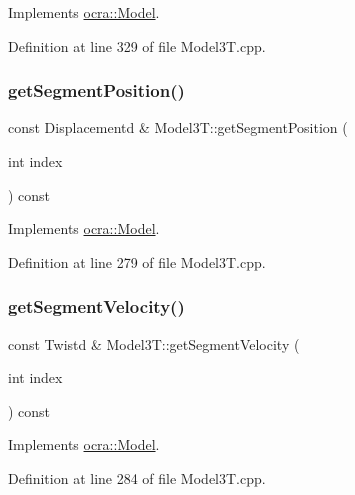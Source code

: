 Implements \hyperlink{classocra_1_1Model_ae296f35e785641df23e6cf4fdbb24f8a}{ocra\+::\+Model}.



Definition at line 329 of file Model3\+T.\+cpp.

\hypertarget{classModel3T_af2408d3a32ae4762ce3c5951360f5f67}{}\label{classModel3T_af2408d3a32ae4762ce3c5951360f5f67} 
\subsubsection{\texorpdfstring{get\+Segment\+Position()}{getSegmentPosition()}}
{\footnotesize\ttfamily const Displacementd \& Model3\+T\+::get\+Segment\+Position (\begin{DoxyParamCaption}\item[{int}]{index }\end{DoxyParamCaption}) const\hspace{0.3cm}{\ttfamily [virtual]}}



Implements \hyperlink{classocra_1_1Model_ae7afe827a1c09b99d80134a447bd9ccc}{ocra\+::\+Model}.



Definition at line 279 of file Model3\+T.\+cpp.

\hypertarget{classModel3T_ac94524afc47ca5c16045b53d6c5b6118}{}\label{classModel3T_ac94524afc47ca5c16045b53d6c5b6118} 
\subsubsection{\texorpdfstring{get\+Segment\+Velocity()}{getSegmentVelocity()}}
{\footnotesize\ttfamily const Twistd \& Model3\+T\+::get\+Segment\+Velocity (\begin{DoxyParamCaption}\item[{int}]{index }\end{DoxyParamCaption}) const\hspace{0.3cm}{\ttfamily [virtual]}}



Implements \hyperlink{classocra_1_1Model_a1ee3b57487621c5194b7d6b014308e40}{ocra\+::\+Model}.



Definition at line 284 of file Model3\+T.\+cpp.

